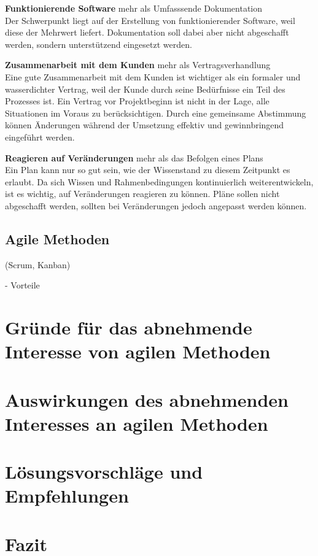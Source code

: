 \documentclass[ngerman]{seminarvorlage}
\begin{document}
\textbf{Funktionierende Software} mehr als Umfasssende Dokumentation\\
Der Schwerpunkt liegt auf der Erstellung von funktionierender Software, weil diese der Mehrwert liefert. Dokumentation soll dabei aber nicht abgeschafft werden, sondern unterstützend eingesetzt werden.

\textbf{Zusammenarbeit mit dem Kunden} mehr als Vertragsverhandlung\\
Eine gute Zusammenarbeit mit dem Kunden ist wichtiger als ein formaler und wasserdichter Vertrag, weil der Kunde durch seine Bedürfnisse ein Teil des Prozesses ist. Ein Vertrag vor Projektbeginn ist nicht in der Lage, alle Situationen im Voraus zu berücksichtigen. Durch eine gemeinsame Abstimmung können Änderungen während der Umsetzung effektiv und gewinnbringend eingeführt werden.

\textbf{Reagieren auf Veränderungen} mehr als das Befolgen eines Plans\\
Ein Plan kann nur so gut sein, wie der Wissenstand zu diesem Zeitpunkt es erlaubt. Da sich Wissen und Rahmenbedingungen kontinuierlich weiterentwickeln, ist es wichtig, auf Veränderungen reagieren zu können. Pläne sollen nicht abgeschafft werden, sollten bei Veränderungen jedoch angepasst werden können.


\subsection {Agile Methoden}  (Scrum, Kanban)

- Vorteile

\section{Gründe für das abnehmende Interesse von agilen Methoden}
\section{Auswirkungen des abnehmenden Interesses an agilen Methoden}
\section{Lösungsvorschläge und Empfehlungen}


\section{Fazit}
\end{document}
